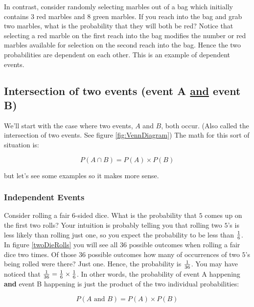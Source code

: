In contrast, consider randomly selecting marbles out of a bag which initially
contains $3$ red marbles and $8$ green marbles.  If you reach into the
bag and grab two marbles, what is the probability that they will both
be red?  Notice that selecting a red marble on the first reach into the bag
modifies the number or red marbles available for selection on the
second reach into the bag. Hence the two probabilities are dependent
on each other.  This is an example of dependent events.

\subsection*{Intersection of two events (event A \underline{and} event B)}

We'll start with the case where two events, $A$ and $B$, both
occur. (Also called the intersection of two events. See figure \ref{fig:VennDiagram})
The math for this sort of situation is:

\begin{equation}
  P(A \cap B) = P(A)  \times P(B)\nonumber
\end{equation}

but let's see some examples so it makes more sense.


\subsubsection*{Independent Events}
Consider rolling a fair $6$-sided dice.  What is the probability that
$5$ comes up on the first two rolls?  Your intuition is probably telling
you that rolling two $5$'s is less likely than rolling just one, so
you expect the probability to be less than ${1\over 6}$.  In figure
\ref{twoDieRolls} you will see all 36 possible outcomes when rolling a
fair dice two times.  Of those 36 possible outcomes how many of
occurrences of two $5$'s being rolled were there?  Just one.  Hence,
the probability is ${1\over 36}$.  You may have noticed that
${1\over 36} = {1\over 6} \times {1\over 6}$.  In other words, the
probability of event A happening \textbf{and} event B happening is
just the product of the two individual probabilities:

\begin{equation}
  P(A\text{ and } B) = P(A) \times P(B)\nonumber
\end{equation}



